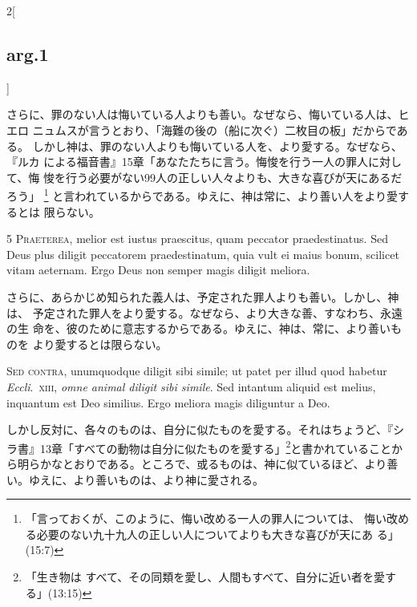 \documentclass[paper=a4paper,fontsize=10pt,jafontsize=9pt,titlepage]{jlreq}
\begin{document}
\begin{paracol}{2}[\subsection{arg.1}]
\switchcolumn

さらに、罪のない人は悔いている人よりも善い。なぜなら、悔いている人は、ヒエロ
 ニュムスが言うとおり、「海難の後の（船に次ぐ）二枚目の板」だからである。
しかし神は、罪のない人よりも悔いている人を、より愛する。なぜなら、『ルカ
 による福音書』15章「あなたたちに言う。悔悛を行う一人の罪人に対して、悔
 悛を行う必要がない99人の正しい人々よりも、大きな喜びが天にあるだろう」
 \footnote{「言っておくが、このように、悔い改める一人の罪人については、
 悔い改める必要のない九十九人の正しい人についてよりも大きな喜びが天にあ
 る」(15:7)}
 と言われているからである。ゆえに、神は常に、より善い人をより愛するとは
 限らない。



{\scshape 5 Praeterea}, melior est iustus praescitus, quam peccator
 praedestinatus. Sed Deus plus diligit peccatorem praedestinatum, quia
 vult ei maius bonum, scilicet vitam aeternam. Ergo Deus non semper
 magis diligit meliora.

\switchcolumn

さらに、あらかじめ知られた義人は、予定された罪人よりも善い。しかし、神は、
 予定された罪人をより愛する。なぜなら、より大きな善、すなわち、永遠の生
 命を、彼のために意志するからである。ゆえに、神は、常に、より善いものを
 より愛するとは限らない。

\switchcolumn*[\subsection{s.c.}]


{\scshape Sed contra}, unumquodque diligit sibi simile; ut patet per
 illud quod habetur {\itshape Eccli}.~{\scshape xiii}, {\itshape omne
 animal diligit sibi simile}. Sed intantum aliquid est melius, inquantum
 est Deo similius. Ergo meliora magis diliguntur a Deo.

\switchcolumn

しかし反対に、各々のものは、自分に似たものを愛する。それはちょうど、『シ
 ラ書』13章「すべての動物は自分に似たものを愛する」\footnote{「生き物は
 すべて、その同類を愛し、人間もすべて、自分に近い者を愛する」(13:15)}と書かれていることか
 ら明らかなとおりである。ところで、或るものは、神に似ているほど、より善
 い。ゆえに、より善いものは、より神に愛される。




\end{paracol}
\end{document}
